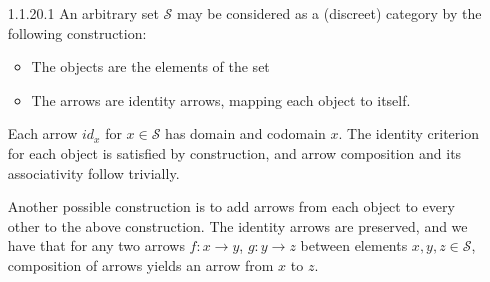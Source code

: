 \documentclass{article}
\begin{document}
\begin{enumerate}
\item[1.1.20.1]
  An arbitrary set $\mathcal{S}$
  may be considered as a (discreet) category by the following construction:
  \begin{itemize}
    \item
      The objects are the elements of the set
    \item 
      The arrows are identity arrows, mapping each object to itself. 
  \end{itemize}
  Each arrow $id_x$ for $x\in\mathcal{S}$ has domain and codomain $x$.
  The identity criterion for each object is satisfied by construction,
  and arrow composition and its associativity follow trivially.

  Another possible construction is to add arrows from each object to
  every other to the above construction. The identity arrows are preserved,
  and we have that for any two arrows $f:x\rightarrow y$, $g:y\rightarrow z$
  between elements $x,y,z\in\mathcal{S}$, 
  composition of arrows yields an arrow from $x$ to $z$. 


      
\end{enumerate}
\end{document}
